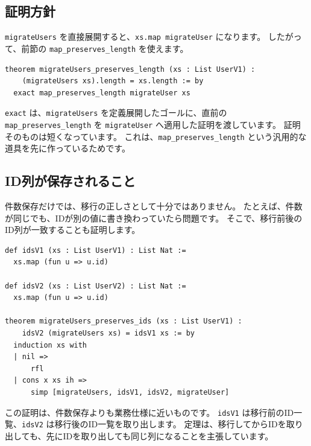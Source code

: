 \subsection{証明方針}

\texttt{migrateUsers} を直接展開すると、\texttt{xs.map migrateUser} になります。
したがって、前節の \texttt{map\_preserves\_length} を使えます。

\begin{listing}[htbp]
\begin{verbatim}
theorem migrateUsers_preserves_length (xs : List UserV1) :
    (migrateUsers xs).length = xs.length := by
  exact map_preserves_length migrateUser xs
\end{verbatim}
\caption{\texttt{migrateUsers\_preserves\_length}}
\label{lst:induction-migrate-length}
\end{listing}

\texttt{exact} は、\texttt{migrateUsers} を定義展開したゴールに、直前の
\texttt{map\_preserves\_length} を \texttt{migrateUser} へ適用した証明を渡しています。
証明そのものは短くなっています。
これは、\texttt{map\_preserves\_length} という汎用的な道具を先に作っているためです。

\subsection{ID列が保存されること}

件数保存だけでは、移行の正しさとして十分ではありません。
たとえば、件数が同じでも、IDが別の値に書き換わっていたら問題です。
そこで、移行前後のID列が一致することも証明します。

\begin{listing}[htbp]
\begin{verbatim}
def idsV1 (xs : List UserV1) : List Nat :=
  xs.map (fun u => u.id)

def idsV2 (xs : List UserV2) : List Nat :=
  xs.map (fun u => u.id)

theorem migrateUsers_preserves_ids (xs : List UserV1) :
    idsV2 (migrateUsers xs) = idsV1 xs := by
  induction xs with
  | nil =>
      rfl
  | cons x xs ih =>
      simp [migrateUsers, idsV1, idsV2, migrateUser]
\end{verbatim}
\caption{\texttt{migrateUsers\_preserves\_ids}}
\label{lst:induction-list-ids}
\end{listing}

この証明は、件数保存よりも業務仕様に近いものです。
\texttt{idsV1} は移行前のID一覧、\texttt{idsV2} は移行後のID一覧を取り出します。
定理は、移行してからIDを取り出しても、先にIDを取り出しても同じ列になることを主張しています。

